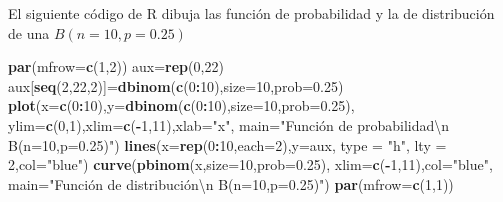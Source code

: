 \documentclass[]{book}
\newenvironment{Shaded}{\begin{snugshade}}{\end{snugshade}}
\newcommand{\CharTok}[1]{\textcolor[rgb]{0.31,0.60,0.02}{#1}}
\newcommand{\DataTypeTok}[1]{\textcolor[rgb]{0.13,0.29,0.53}{#1}}
\newcommand{\DecValTok}[1]{\textcolor[rgb]{0.00,0.00,0.81}{#1}}
\newcommand{\FloatTok}[1]{\textcolor[rgb]{0.00,0.00,0.81}{#1}}
\newcommand{\KeywordTok}[1]{\textcolor[rgb]{0.13,0.29,0.53}{\textbf{#1}}}
\newcommand{\NormalTok}[1]{#1}
\newcommand{\OperatorTok}[1]{\textcolor[rgb]{0.81,0.36,0.00}{\textbf{#1}}}
\newcommand{\StringTok}[1]{\textcolor[rgb]{0.31,0.60,0.02}{#1}}
\begin{document}
El siguiente código de R dibuja las función de probabilidad y la de distribución de una \(B(n=10,p=0.25)\)

\begin{Shaded}
\begin{Highlighting}[]
\KeywordTok{par}\NormalTok{(}\DataTypeTok{mfrow=}\KeywordTok{c}\NormalTok{(}\DecValTok{1}\NormalTok{,}\DecValTok{2}\NormalTok{))}
\NormalTok{aux=}\KeywordTok{rep}\NormalTok{(}\DecValTok{0}\NormalTok{,}\DecValTok{22}\NormalTok{)}
\NormalTok{aux[}\KeywordTok{seq}\NormalTok{(}\DecValTok{2}\NormalTok{,}\DecValTok{22}\NormalTok{,}\DecValTok{2}\NormalTok{)]=}\KeywordTok{dbinom}\NormalTok{(}\KeywordTok{c}\NormalTok{(}\DecValTok{0}\OperatorTok{:}\DecValTok{10}\NormalTok{),}\DataTypeTok{size=}\DecValTok{10}\NormalTok{,}\DataTypeTok{prob=}\FloatTok{0.25}\NormalTok{)}
\KeywordTok{plot}\NormalTok{(}\DataTypeTok{x=}\KeywordTok{c}\NormalTok{(}\DecValTok{0}\OperatorTok{:}\DecValTok{10}\NormalTok{),}\DataTypeTok{y=}\KeywordTok{dbinom}\NormalTok{(}\KeywordTok{c}\NormalTok{(}\DecValTok{0}\OperatorTok{:}\DecValTok{10}\NormalTok{),}\DataTypeTok{size=}\DecValTok{10}\NormalTok{,}\DataTypeTok{prob=}\FloatTok{0.25}\NormalTok{),}
  \DataTypeTok{ylim=}\KeywordTok{c}\NormalTok{(}\DecValTok{0}\NormalTok{,}\DecValTok{1}\NormalTok{),}\DataTypeTok{xlim=}\KeywordTok{c}\NormalTok{(}\OperatorTok{-}\DecValTok{1}\NormalTok{,}\DecValTok{11}\NormalTok{),}\DataTypeTok{xlab=}\StringTok{"x"}\NormalTok{,}
  \DataTypeTok{main=}\StringTok{"Función de probabilidad}\CharTok{\textbackslash{}n}\StringTok{ B(n=10,p=0.25)"}\NormalTok{)}
\KeywordTok{lines}\NormalTok{(}\DataTypeTok{x=}\KeywordTok{rep}\NormalTok{(}\DecValTok{0}\OperatorTok{:}\DecValTok{10}\NormalTok{,}\DataTypeTok{each=}\DecValTok{2}\NormalTok{),}\DataTypeTok{y=}\NormalTok{aux, }\DataTypeTok{type =} \StringTok{"h"}\NormalTok{, }\DataTypeTok{lty =} \DecValTok{2}\NormalTok{,}\DataTypeTok{col=}\StringTok{"blue"}\NormalTok{)}
\KeywordTok{curve}\NormalTok{(}\KeywordTok{pbinom}\NormalTok{(x,}\DataTypeTok{size=}\DecValTok{10}\NormalTok{,}\DataTypeTok{prob=}\FloatTok{0.25}\NormalTok{),}
  \DataTypeTok{xlim=}\KeywordTok{c}\NormalTok{(}\OperatorTok{-}\DecValTok{1}\NormalTok{,}\DecValTok{11}\NormalTok{),}\DataTypeTok{col=}\StringTok{"blue"}\NormalTok{,}
  \DataTypeTok{main=}\StringTok{"Función de distribución\textbackslash{}n B(n=10,p=0.25)"}\NormalTok{)}
\KeywordTok{par}\NormalTok{(}\DataTypeTok{mfrow=}\KeywordTok{c}\NormalTok{(}\DecValTok{1}\NormalTok{,}\DecValTok{1}\NormalTok{))}
\end{Highlighting}
\end{Shaded}
\end{document}
